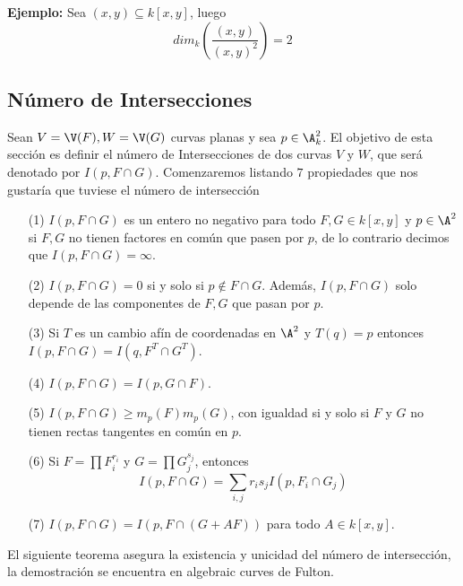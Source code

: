 \documentclass{article}
\begin{document}
\vspace{2mm}
\noindent\textbf{Ejemplo:} Sea $(x,y)\subseteq k[x,y]$, luego
\begin{equation*}
    dim_{k}\left(\frac{(x,y)}{(x,y)^{2}}\right)=2
\end{equation*}

\subsection{Número de Intersecciones}
\noindent Sean $V=\V(F),W=\V(G)$ curvas planas y sea $p\in\A^{2}_{k}$. El objetivo de esta sección 
es definir el número de Intersecciones de dos curvas $V$ y $W$, que será denotado por 
$I(p,F\cap G)$. Comenzaremos listando $7$ propiedades que nos gustaría que tuviese el número de
intersección
\begin{enumerate}
    \item[(1)] $I(p,F\cap G)$ es un entero no negativo para todo $F,G\in k[x,y]$ y $p\in\A^{2}$ si 
    $F,G$ no tienen factores en común que pasen por $p$, de lo contrario decimos que 
    $I(p,F\cap G)=\infty$.

    \item[(2)] $I(p,F\cap G)=0$ si y solo si $p\not\in F\cap G$. Además, $I(p,F\cap G)$ solo 
    depende de las componentes de $F,G$ que pasan por $p$.

    \item[(3)] Si $T$ es un cambio afín de coordenadas en $\A^{2}$ y $T(q)=p$ entonces 
    $I(p,F\cap G)=I(q,F^{T}\cap G^{T})$.

    \item[(4)] $I(p,F\cap G)=I(p,G\cap F)$.
    
    \item[(5)] $I(p,F\cap G)\geq m_{p}(F)m_{p}(G)$, con igualdad si y solo si $F$ y $G$ no tienen
    rectas tangentes en común en $p$.

    \item[(6)] Si $F=\prod F_{i}^{r_{i}}$ y $G=\prod G_{j}^{s_{j}}$, entonces
    \begin{equation*}
        I(p,F\cap G)=\sum_{i,j}r_{i}s_{j}I(p,F_{i}\cap G_{j})
    \end{equation*}
    
    \item[(7)] $I(p,F\cap G)=I(p,F\cap(G+AF))$ para todo $A\in k[x,y]$.
\end{enumerate}
\noindent El siguiente teorema asegura la existencia y unicidad del número de intersección, la
demostración se encuentra en algebraic curves de Fulton.
\end{document}

